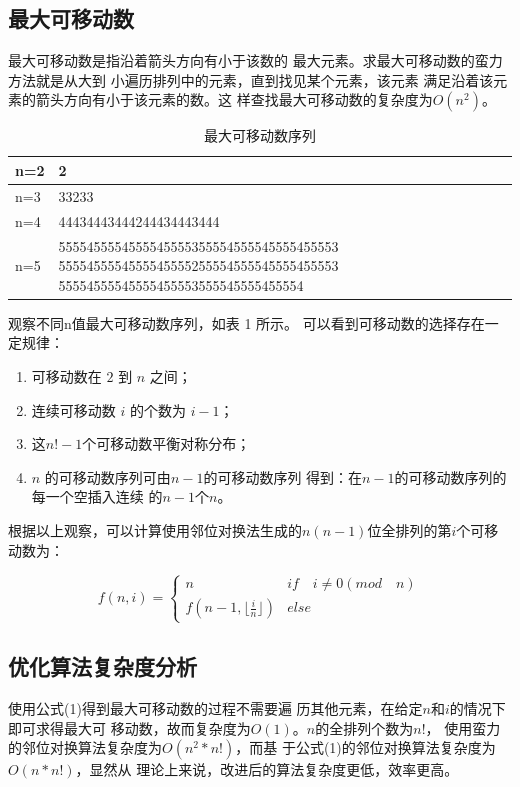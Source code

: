 \documentclass[6pt, twocolumn]{ctexart}
\begin{document}
\subsection{最大可移动数}
最大可移动数是指沿着箭头方向有小于该数的 最大元素。求最大可移动数的蛮力方法就是从大到 小遍历排列中的元素，直到找见某个元素，该元素 满足沿着该元素的箭头方向有小于该元素的数。这 样查找最大可移动数的复杂度为$O(n^2)$。
\begin{table}
\centering 
    \caption {最大可移动数序列}
    \begin{tabular}{|m{1cm}|m{8cm}|}
    \hline
    n=2 & 2                                                                                                                     \\ \hline
    n=3 & 33233                                                                                                                 \\ \hline
    n=4 & 44434443444244434443444                                                                                               \\ \hline
    n=5 & 5555455554555545555355554555545555455553 5555455554555545555255554555545555455553 55554555545555455553555545555455554 \\ \hline
    \end{tabular}
\end{table}

观察不同n值最大可移动数序列，如表 1 所示。 可以看到可移动数的选择存在一定规律：
\begin{enumerate}
	\item 可移动数在 $2$ 到 $n$ 之间；
	\item 连续可移动数 $i$ 的个数为 $i-1$；
	\item 这$n! − 1$个可移动数平衡对称分布；
	\item $n$ 的可移动数序列可由$n − 1$的可移动数序列 得到：在$n − 1$的可移动数序列的每一个空插入连续 的$n − 1$个$n$。
\end{enumerate}
根据以上观察，可以计算使用邻位对换法生成的$n(n-1)$位全排列的第$i$个可移动数为：

\begin{equation}
f(n,i) =\begin{cases}
n&if \quad i \ne 0(mod \quad n)\\
f(n-1,\lfloor \frac{i}{n} \rfloor ) & else	
\end{cases}
\end{equation}
\subsection{优化算法复杂度分析}
使用公式(1)得到最大可移动数的过程不需要遍 历其他元素，在给定$n$和$i$的情况下即可求得最大可 移动数，故而复杂度为$O(1)$。$n$的全排列个数为$n!$， 使用蛮力的邻位对换算法复杂度为$O(n^2 * n!)$，而基 于公式(1)的邻位对换算法复杂度为$O(n*n!)$，显然从 理论上来说，改进后的算法复杂度更低，效率更高。
\end{document}
